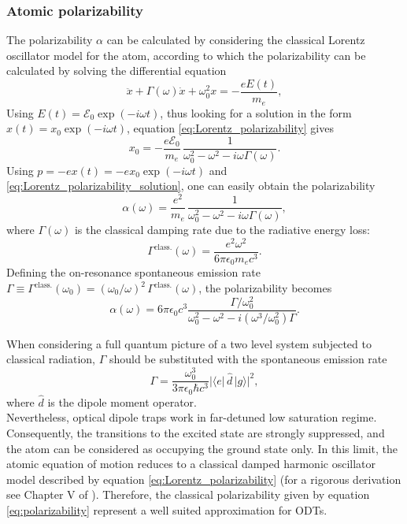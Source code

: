 \subsubsection{Atomic polarizability}
The polarizability $\alpha$ can be calculated by considering the classical Lorentz oscillator model for the atom, according to which the polarizability can be calculated by solving the differential equation
\begin{equation}
    \label{eq:Lorentz_polarizability}
    \ddot{x}+\Gamma(\omega) \dot{x} + \omega_0^2x = -\frac{eE(t)}{m_e},
\end{equation}
Using $E(t)=\mathcal{E}_0\exp(-i\omega t)$, thus looking for a solution in the form $x(t)=x_0\exp(-i\omega t)$, equation \eqref{eq:Lorentz_polarizability} gives
\begin{equation}
    \label{eq:Lorentz_polarizability_solution}
    x_0 = - \frac{e\mathcal{E}_0}{m_e} \,\frac{1}{\omega_0^2 -\omega^2 -i\omega\Gamma(\omega)}.
\end{equation}
Using $p= -ex(t)=-ex_0\exp(-i\omega t)$ and \eqref{eq:Lorentz_polarizability_solution}, one can easily obtain the polarizability
\begin{equation}
    \alpha(\omega) = \frac{e^2}{m_e} \,\frac{1}{\omega_0^2 -\omega^2 -i\omega\Gamma(\omega)},
\end{equation}
where $\Gamma(\omega)$ is the classical damping rate due to the radiative energy loss:
\begin{equation}
    \Gamma^\text{class.}(\omega) = \frac{e^2 \omega^2}{6 \pi \epsilon_0 m_e c^3}.
\end{equation}
Defining the on-resonance spontaneous emission rate $\Gamma\equiv  \Gamma^\text{class.}(\omega_0) = (\omega_0/\omega)^2\,\Gamma^\text{class.}(\omega)$, the polarizability becomes
\begin{equation}
    \label{eq:polarizability}
    \alpha(\omega) = 6 \pi \epsilon_0 c^3 \frac{\Gamma / \omega_0^2}{\omega_0^2 - \omega^2 - i (\omega^3 / \omega_0^2) \Gamma}.
\end{equation}

When considering a full quantum picture of a two level system subjected to classical radiation, $\Gamma$ should be substituted with the spontaneous emission rate
\begin{equation}
    \label{eq:quantum_gamma}
    \Gamma = \frac{\omega_0^3}{3\pi\epsilon_0\hbar c^3}|\langle e|\,\hat{d}\,|g\rangle|^2,
\end{equation}
where $\hat{d}$ is the dipole moment operator.\\
Nevertheless, optical dipole traps work in far-detuned low saturation regime. Consequently, the transitions to the excited state are strongly suppressed, and the atom can be considered as occupying the ground state only. In this limit, the atomic equation of motion reduces to a classical damped harmonic oscillator model described by equation \ref{eq:Lorentz_polarizability} (for a rigorous derivation see Chapter V of \citeauthor*{steck_quantum_optics} \cite{steck_quantum_optics}). Therefore, the classical polarizability given by equation \ref{eq:polarizability} represent a well suited approximation for ODTs.

